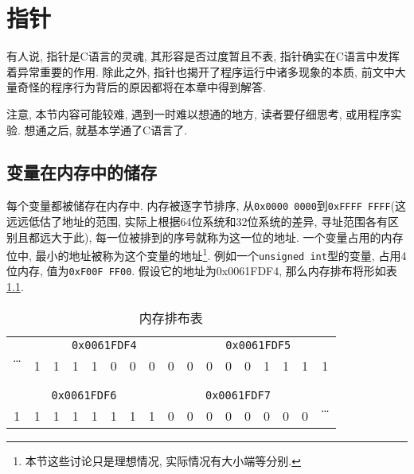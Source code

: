 \chapter{指针} \label{指针}
    有人说, 指针是C语言的灵魂, 其形容是否过度暂且不表, 指针确实在C语言中发挥着异常重要的作用. 除此之外, 指针也揭开了程序运行中诸多现象的本质, 前文中大量奇怪的程序行为背后的原因都将在本章中得到解答.

    注意, 本节内容可能较难, 遇到一时难以想通的地方, 读者要仔细思考, 或用程序实验. 想通之后, 就基本学通了C语言了.

    \section{变量在内存中的储存}
        每个变量都被储存在内存中. 内存被逐字节排序, 从\texttt{0x0000 0000}到\texttt{0xFFFF FFFF}(这远远低估了地址的范围, 实际上根据64位系统和32位系统的差异, 寻址范围各有区别且都远大于此), 每一位被排到的序号就称为这一位的地址. 一个变量占用的内存位中, 最小的地址被称为这个变量的地址\footnote{本节这些讨论只是理想情况, 实际情况有大小端等分别.}. 例如一个\texttt{unsigned int}型的变量, 占用4位内存, 值为\texttt{0xF00F FF00}. 假设它的地址为0x0061FDF4, 那么内存排布将形如表\ref{内存排布表}.
        \begin{table}[htbp]
            \centering
            \begin{tabular}{c|c|c|c|c|c|c|c|c|c|c|c|c|c|c|c|c}
                \hline
                \multirow{2}{*}{\Large \dots} & \multicolumn{8}{|c|}{\texttt{0x0061FDF4}} & \multicolumn{8}{|c|}{\texttt{0x0061FDF5}} \\
                \cline{2-17}
                & 1 & 1 & 1 & 1 & 0 & 0 & 0 & 0 & 0 & 0 & 0 & 0 & 1 & 1 & 1 & \multicolumn{1}{|c|}{1} \\
                \hline
                \multicolumn{17}{c}{ }\\
                \multicolumn{17}{c}{ }\\
                \hline
                \multicolumn{8}{|c|}{\texttt{0x0061FDF6}} & \multicolumn{8}{|c|}{\texttt{0x0061FDF7}} & \multirow{2}{*}{\Large \dots} \\
                \cline{1-16}
                \multicolumn{1}{|c|}{1} & 1 & 1 & 1 & 1 & 1 & 1 & 1 & 0 & 0 & 0 & 0 & 0 & 0 & 0 & 0 & \\
                \hline
            \end{tabular}
            \caption{内存排布表} \label{内存排布表}
        \end{table}

